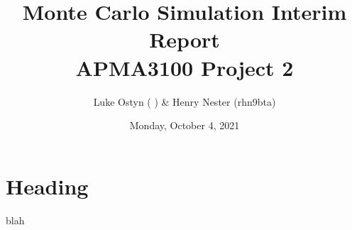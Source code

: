 \documentclass{article}
\begin{document}
\title{Monte Carlo Simulation Interim Report\\APMA3100 Project 2}
\author{Luke Ostyn ( ) \& Henry Nester (rhn9bta)}
\date{Monday, October 4, 2021}

\maketitle

\section{Heading}
blah
\end{document}
